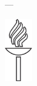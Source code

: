 \thispagestyle{empty}
\begin{center}

\vspace*{6.5cm}

\myName

\vspace{0.5cm}

\textbf{\Large \MakeTextUppercase{\myTitle}}

---

\large \MakeTextUppercase{\mySubtitle}

\vspace{9cm}

\includegraphics[height=2.7cm]{gfx/jyu-logo.eps}


\normalsize
\MakeTextUppercase{\myUni}\\
\footnotesize
\MakeTextUppercase{\myFaculty}\\
\MakeTextUppercase{\myDepartment}\\
\myTime

\end{center}